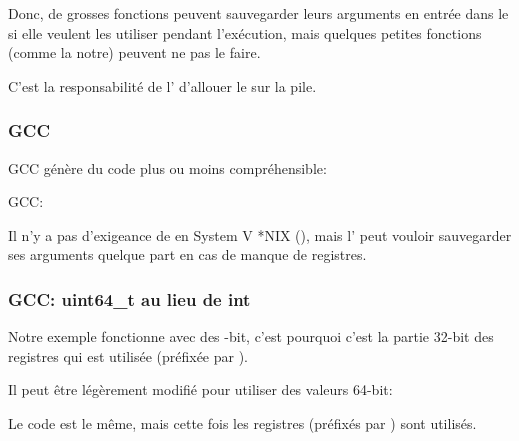 Donc, de grosses fonctions peuvent sauvegarder leurs arguments en entrée dans le 
si elle veulent les utiliser pendant l'exécution, mais quelques petites fonctions
(comme la notre) peuvent ne pas le faire.

C'est la responsabilité de l' d'allouer le 
sur la pile.

\subsubsection{GCC}

GCC \Optimizing génère du code plus ou moins compréhensible:



\NonOptimizing GCC:




Il n'y a pas d'exigeance de  en System V *NIX (\SysVABI), mais
l' peut vouloir sauvegarder ses arguments quelque part
en cas de manque de registres.

\subsubsection{GCC: uint64\_t au lieu de int}


Notre exemple fonctionne avec des -bit, c'est pourquoi c'est la partie 32-bit
des registres qui est utilisée (préfixée par ).

Il peut être légèrement modifié pour utiliser des valeurs 64-bit:





Le code est le même, mais cette fois les registres  (préfixés par ) sont utilisés.

